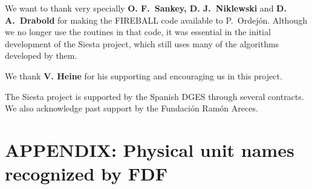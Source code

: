 \documentclass[11pt]{article}
\begin{document}
We want to thank very specially {\bf O. F.\ Sankey, D. J.\ Niklewski}
and {\bf D. A.\ Drabold} for making the FIREBALL code available to
P.\ Ordej\'on.  Although we no longer use the routines in that code,
it was essential in the initial development of the {\sc Siesta}
project, which still uses many of the algorithms developed by them.

We thank {\bf V. Heine} for his supporting and encouraging us in this
project.

The {\sc Siesta} project is supported by the Spanish DGES through
several contracts. We also acknowledge past support by the Fundaci\'on
Ram\'on Areces.



\section{APPENDIX: Physical unit names recognized by FDF}
\end{document}
